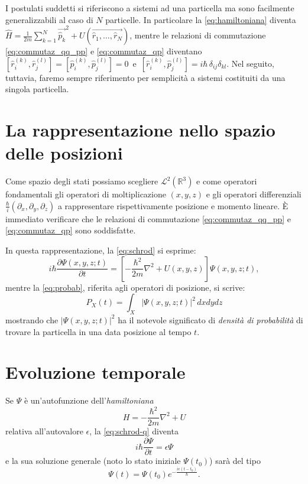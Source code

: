 I postulati suddetti si riferiscono a sistemi ad una particella
ma sono facilmente generalizzabili al caso di $N$ particelle. In particolare
la \eqref{eq:hamiltoniana} diventa 
$ \hat{H} = \frac{1}{2m} \sum_{k=1}^{N} \vec{\hat{p}_{k}}^2  + 
U(  \vec{\hat{r}_{1},\dots,\hat{r}_{N}}    ) $, mentre le relazioni
di commutazione \eqref{eq:commutaz_qq_pp} e \eqref{eq:commutaz_qp} 
diventano 
$[\hat{r}_i^{(k)}, \hat{r}_j^{(l)}] = [\hat{p}_i^{(k)}, \hat{p}_j^{(l)}] = 0\,$
 e
$\,[\hat{r}_i^{(k)}, \hat{p}_j^{(l)}] = i\hbar \, \delta_{ij}\delta_{kl}$.
Nel seguito, tuttavia, faremo sempre riferimento per semplicità a sistemi 
costituiti da una singola particella. 

\section{La rappresentazione nello spazio delle posizioni}

Come spazio degli stati possiamo scegliere 
$\mathcal{L}^2(\mathbb{R}^3)$ e come operatori fondamentali gli operatori
di moltiplicazione $(x, y, z)$ e gli operatori differenziali
$\frac{\hbar}{i}(\partial_x, \partial_y, \partial_z)$ a rappresentare
rispettivamente posizione e momento lineare. \`E immediato
verificare che le relazioni di commutazione \eqref{eq:commutaz_qq_pp} 
e \eqref{eq:commutaz_qp}
sono soddisfatte.

In questa rappresentazione, la \eqref{eq:schrod} si esprime:
\begin{equation}
  i\hbar\frac{\partial\Psi(x, y, z; t)}{\partial t} = 
  \left[-\frac{\hbar^2}{2m}\nabla^2 + U(x,y,z)\right]\Psi(x,y,z;t) ,
  \label{eq:schrod-q}
\end{equation}
mentre la \eqref{eq:probab}, riferita agli operatori di
posizione, si scrive:
\[
  P_X(t) = \int_X |\Psi(x,y,z; t)|^2\,dxdydz
\]
mostrando che $|\Psi(x,y,z;t)|^2$ ha il notevole significato di 
\emph{densità di probabilità} di trovare la particella in una
data posizione al tempo $t$. 

\section{Evoluzione temporale}

Se $\Psi$ è un'autofunzione dell'\emph{hamiltoniana}
\[
  H = -\frac{\hbar^2}{2m}\nabla^2 + U 
\]
relativa all'autovalore $\epsilon$, la \eqref{eq:schrod-q} diventa
\[
  i\hbar\frac{\partial\Psi}{\partial t} = \epsilon\Psi
\]
e la sua soluzione generale (noto lo stato iniziale $\Psi(t_0)$) 
sarà del tipo
\[
  \Psi(t) = \Psi(t_0) e^{-\frac{i\epsilon(t-t_0)}{\hbar}}.
\]

